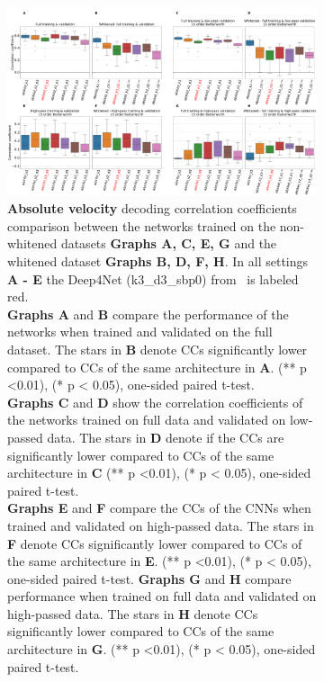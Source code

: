 \begin{figure}[!htbp]\ContinuedFloat
\begin{subfigure}[b]{\textwidth}
   \includegraphics[width=1\linewidth]{img/ch4/absVel-pw-vs-non-pw-performance}
   \caption{\textbf{Absolute velocity} decoding correlation coefficients comparison between the networks trained on the non-whitened datasets \textbf{Graphs A, C, E, G} and the whitened dataset \textbf{Graphs B, D, F, H}.
   In all settings \textbf{A - E} the Deep4Net (k3\_d3\_sbp0) from~\cite{Hammer-2021} is labeled red.
   \\ \textbf{Graphs A} and \textbf{B} compare the performance of the networks when trained and validated on the full dataset.
   The stars in \textbf{B} denote CCs significantly lower compared to CCs of the same architecture in \textbf{A}. (** p <0.01), (* p < 0.05), one-sided paired t-test.
   \\\textbf{Graphs C} and \textbf{D} show the correlation coefficients of the networks trained on full data and validated on low-passed data.
   The stars in \textbf{D} denote if the CCs are significantly lower compared to CCs of the same architecture in \textbf{C} (** p <0.01), (* p < 0.05), one-sided paired t-test.
   \\\textbf{Graphs E} and \textbf{F} compare the CCs of the CNNs when trained and validated on high-passed data.
   The stars in \textbf{F} denote CCs significantly lower compared to CCs of the same architecture in \textbf{E}. (** p <0.01), (* p < 0.05), one-sided paired t-test.
   \textbf{Graphs G} and \textbf{H} compare performance when trained on full data and validated on high-passed data.
   The stars in \textbf{H} denote CCs significantly lower compared to CCs of the same architecture in \textbf{G}. (** p <0.01), (* p < 0.05), one-sided paired t-test.}
   \label{fig:absVel-pw-performance}
\end{subfigure}
\caption[Spectral whitening - performance comparison]{}
\label{fig:pw-performance}
\end{figure}

